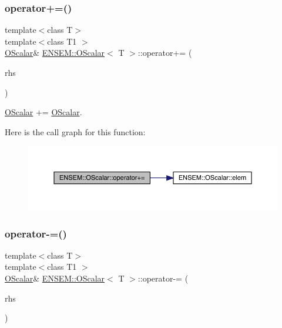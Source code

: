 \subsubsection{\texorpdfstring{operator+=()}{operator+=()}\hspace{0.1cm}{\footnotesize\ttfamily [2/2]}}
{\footnotesize\ttfamily template$<$class T$>$ \\
template$<$class T1 $>$ \\
\mbox{\hyperlink{classENSEM_1_1OScalar}{O\+Scalar}}\& \mbox{\hyperlink{classENSEM_1_1OScalar}{E\+N\+S\+E\+M\+::\+O\+Scalar}}$<$ T $>$\+::operator+= (\begin{DoxyParamCaption}\item[{const \mbox{\hyperlink{classENSEM_1_1OScalar}{O\+Scalar}}$<$ T1 $>$ \&}]{rhs }\end{DoxyParamCaption})\hspace{0.3cm}{\ttfamily [inline]}}



\mbox{\hyperlink{classENSEM_1_1OScalar}{O\+Scalar}} += \mbox{\hyperlink{classENSEM_1_1OScalar}{O\+Scalar}}. 

Here is the call graph for this function\+:
\nopagebreak
\begin{figure}[H]
\begin{center}
\leavevmode
\includegraphics[width=350pt]{da/d80/classENSEM_1_1OScalar_a3109a05113cade86410bc77f60812023_cgraph}
\end{center}
\end{figure}
\mbox{\label{classENSEM_1_1OScalar_a4d240e95768b5a0c9537b32d00d60ac5}} 
\subsubsection{\texorpdfstring{operator-\/=()}{operator-=()}\hspace{0.1cm}{\footnotesize\ttfamily [1/2]}}
{\footnotesize\ttfamily template$<$class T$>$ \\
template$<$class T1 $>$ \\
\mbox{\hyperlink{classENSEM_1_1OScalar}{O\+Scalar}}\& \mbox{\hyperlink{classENSEM_1_1OScalar}{E\+N\+S\+E\+M\+::\+O\+Scalar}}$<$ T $>$\+::operator-\/= (\begin{DoxyParamCaption}\item[{const \mbox{\hyperlink{classENSEM_1_1OScalar}{O\+Scalar}}$<$ T1 $>$ \&}]{rhs }\end{DoxyParamCaption})\hspace{0.3cm}{\ttfamily [inline]}}



